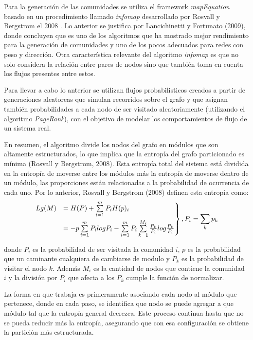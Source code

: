 \documentclass[12pt]{article}
\begin{document}
	Para la generación de las comunidades se utiliza el framework \textit{mapEquation} basado en un procedimiento llamado \textit{infomap} desarrollado por Rosvall y Bergstrom el 2008 \cite{Infomap}. Lo anterior se justifica por Lancichinetti y Fortunato (2009)\cite{Comparar_generador_comunidad}, donde concluyen que es uno de los algoritmos que ha mostrado mejor rendimiento para la generación de comunidades y uno de los pocos adecuados para redes con peso y dirección. Otra característica relevante del algoritmo \textit{infomap} es que no solo considera la relación entre pares de nodos sino que también toma en cuenta los flujos presentes entre estos. 
	
	Para llevar a cabo lo anterior se utilizan flujos probabilisticos creados a partir de generaciones aleatoreas que simulan recorridos sobre el grafo y que asignan también probabilidades a cada nodo de ser visitado aleatoriamente (utilizando el algoritmo \textit{PageRank}), con el objetivo de modelar los comportamientos de flujo de un sistema real.
	
	En resumen, el algoritmo divide los nodos del grafo en módulos que son altamente estructurados, lo que implica que la entropía del grafo particionado es mínima (Rosvall y Bergstrom, 2008)\cite{Infomap}. Esta entropía total del sistema está dividida en la entropía de moverse entre los módulos más la entropía de moverse dentro de un módulo, las proporciones están relacionadas a la probabilidad de ocurrencia de cada uno. Por lo anterior, Rosvall y Bergstrom (2008) definen esta entropía como:
	$$
	\begin{rcases}
	Lg(M) &= H(P) + \sum\limits_{i=1}^m P_i H(p)_i \\
	      &= -p\sum\limits_{i=1}^m P_i log P_i -\sum\limits_{i=1}^m P_i\sum\limits_{k=1}^{M_i} \frac{P_k}{P_i}log\frac{P_k}{P_i}
	\end{rcases} , P_i = \sum_k p_k
	$$
	
donde $P_i$	es la probabilidad de ser visitada la comunidad $i$, $p$ es la probabilidad que un caminante cualquiera de cambiarse de modulo y $P_k$ es la probabilidad de visitar el nodo $k$. Además $M_i$ es la cantidad de nodos que contiene la comunidad $i$ y la división por $P_i$ que afecta a los $P_k$ cumple la función de normalizar.

La forma en que trabaja es primeramente asociando cada nodo al módulo que pertenece, donde en cada paso, se identifica que nodo se puede agregar a que módulo tal que la entropía general decrezca. Este proceso continua hasta que no se pueda reducir más la entropía, asegurando que con esa configuración se obtiene la partición más estructurada.
\end{document}
